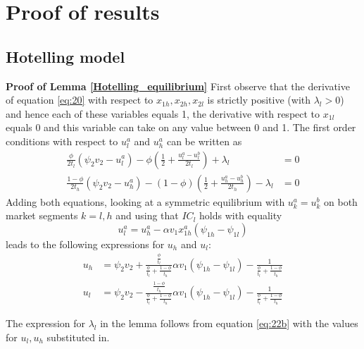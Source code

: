 \documentclass[a4paper,12pt]{article}
\begin{document}
\setcounter{table}{0}
\renewcommand{\thetable}{\thesection\arabic{table}}



\section{Proof of results}
\label{sec:orge33f889}

\subsection{Hotelling model}
\label{sec:org45dc040}

\textbf{Proof of Lemma \ref{Hotelling_equilibrium}}
First observe that the derivative of equation \eqref{eq:20} with respect to \(x_{1h},x_{2h},x_{2l}\) is strictly positive (with \(\lambda_l >0\)) and hence each of these variables equals 1, the derivative with respect to \(x_{1l}\) equals 0 and this variable can take on any value between 0 and 1. The first order conditions with respect to \(u_l^a\) and \(u_h^a\) can be written as
\begin{align}
\label{eq:22}
\frac{\phi}{2t_l}(\psi_2 v_2 - u_l^a) - \phi(\frac{1}{2} + \frac{u_l^a-u_l^b}{2t_l}) + \lambda_{l}  &=0 \\
\label{eq:22b}
\frac{1-\phi}{2t_h}(\psi_2 v_2 - u_h^a) - (1-\phi)(\frac{1}{2} + \frac{u_h^a-u_h^b}{2t_h}) - \lambda_{l}  &=0
\end{align}
Adding both equations, looking at a symmetric equilibrium with \(u_k^a=u_k^b\) on both market segments \(k=l,h\)  and using that \(IC_l\) holds with equality
\begin{equation}
\label{eq:23}
u_l^a = u_h^a - \alpha v_1 x_{1h}^a (\psi_{1h}-\psi_{1l})
\end{equation}
leads to the following expressions for \(u_h\) and \(u_l\):
\begin{align}
\label{eq:21}
u_h &= \psi_2 v_2 + \frac{\frac{\phi}{t_l}}{\frac{\phi}{t_l}+\frac{1-\phi}{t_h}}\alpha v_1 (\psi_{1h}-\psi_{1l})- \frac{1}{\frac{\phi}{t_l}+\frac{1-\phi}{t_h}}  \\
\label{eq:21b}
u_l &= \psi_2 v_2 - \frac{\frac{1-\phi}{t_h}}{\frac{\phi}{t_l}+\frac{1-\phi}{t_h}}\alpha v_1 (\psi_{1h}-\psi_{1l})- \frac{1}{\frac{\phi}{t_l}+\frac{1-\phi}{t_h}}
\end{align}

The expression for \(\lambda_{l}\) in the lemma follows from equation \eqref{eq:22b} with the values for \(u_l,u_h\) substituted in.
\end{document}
